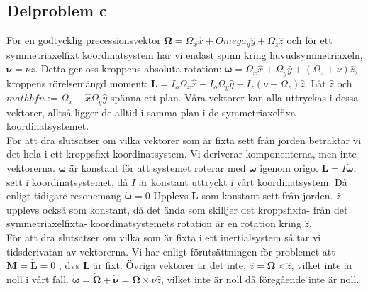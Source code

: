 \documentclass[12pt,a4paper]{article}
\begin{document}
\subsection{Delproblem c}
För en godtycklig precessionsvektor $\boldsymbol{\Omega}= \Omega_x \hat{x} + Omega_y \hat{y} + \Omega_z \hat{z}$ och för ett symmetriaxelfixt koordinatsystem har vi endast spinn kring huvudsymmetriaxeln, $\boldsymbol{\nu}=\nu \hat{z}$. Detta ger oss kroppens absoluta rotation: $\boldsymbol{\omega}=\Omega_x \hat{x} + \Omega_y \hat{y} + (\Omega_z + \nu )\hat{z}$, kroppens rörelsemängd moment: $\mathbf{L}=I_o \Omega_x \hat{x} + I_o \Omega_y \hat{y} + I_z (\nu + \Omega_z) \hat{z}$. Låt $\hat{z}$ och $mathbf{n} := \Omega_x + \hat{x} \Omega_y \hat{y}$ spänna ett plan. Våra vektorer kan alla uttryckas i dessa vektorer, alltså ligger de alltid i samma plan i de symmetriaxelfixa koordinatsystemet. \\
För att dra slutsatser om vilka vektorer som är fixta sett från jorden betraktar vi det hela i ett kroppsfixt koordinatsystem. Vi deriverar komponenterna, men inte vektorerna. $\boldsymbol{\omega}$ är konstant för att systemet roterar med $\boldsymbol{\omega}$ igenom origo. $\mathbf{L}=I\dot{\boldsymbol{\omega}}$, sett i koordinatsystemet, då $I$ är konstant uttryckt i vårt koordinatsystem. Då enligt tidigare resonemang $\dot{\boldsymbol{\omega}}=0$ Upplevs $\mathbf{L}$ som konstant sett från jorden. $\hat{z}$ upplevs också som konstant, då det ända som skilljer det kroppsfixta- från det symmetriaxelfixta- koordinatsystemets rotation är en rotation kring $\hat{z}$.\\

För att dra slutsatser om vilka som är fixta i ett inertialsystem så tar vi tidsderivatan av vektorerna. Vi har enligt förutsättningen för problemet att $\mathbf{M} = \dot{\mathbf{L}}=0$ , dvs $\mathbf{L}$ är fixt. Övriga vektorer är det inte, $\dot{\hat{z}}=\boldsymbol{\Omega} \times \hat{z}$, vilket inte är noll i vårt fall. $\dot{\boldsymbol{\omega}} = \dot{\boldsymbol{\Omega}}+\dot{\boldsymbol{\nu}} = \boldsymbol{\Omega} \times \nu \hat{z}$, vilket inte är noll då föregående inte är noll.
\end{document}
